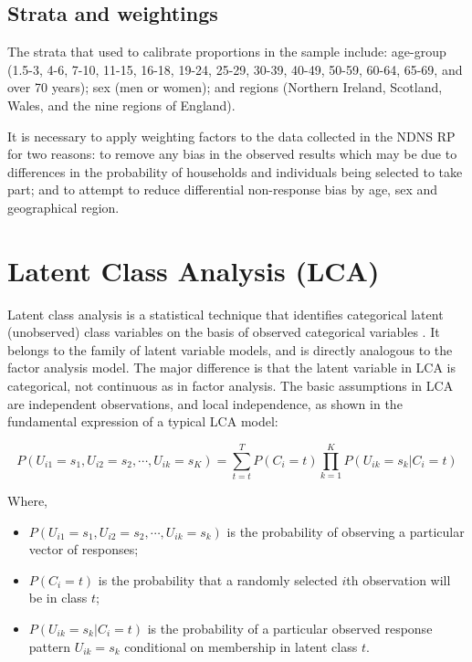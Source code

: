 \subsection{Strata and weightings}\vspace{-0.3cm}

The strata that used to calibrate proportions in the sample include: age-group (1.5-3, 4-6, 7-10, 11-15, 16-18, 19-24, 25-29, 30-39, 40-49, 50-59, 60-64, 65-69, and over 70 years); sex (men or women); and regions (Northern Ireland, Scotland, Wales, and the nine regions of England). 

It is necessary to apply weighting factors to the data collected in the NDNS RP for two reasons: to remove any bias in the observed results which may be due to differences in the probability of households and individuals being selected to take part; and to attempt to reduce differential non-response bias by age, sex and geographical region. 

\section{Latent Class Analysis (LCA)}\vspace{-0.3cm}

Latent class analysis is a statistical technique that identifies categorical latent (unobserved) class variables on the basis of observed categorical variables \parencite{collins2010latent}. It belongs to the family of latent variable models, and is directly analogous to the factor analysis model. The major difference is that the latent variable in LCA is categorical, not continuous as in factor analysis. The basic assumptions in LCA are independent observations, and local independence, as shown in the fundamental expression of a typical LCA model: \vspace{-0.8cm}

\begin{equation}
P(U_{i1} = s_1, U_{i2} = s_2, \cdots, U_{ik} = s_K) = \sum_{t=t}^{T}P(C_i = t)\prod_{k = 1}^{K}P(U_{ik} = s_k | C_i = t)
\label{LCA}
\end{equation}\vspace{-0.7cm}

Where, 

\begin{itemize}
	\item $P(U_{i1} = s_1, U_{i2} = s_2, \cdots, U_{ik} = s_k)$ is the probability of observing a particular vector of responses;
	\item $P(C_i = t)$ is the probability that a randomly selected $i$th observation will be in class $t$;
	\item $P(U_{ik} = s_k | C_i = t)$ is the probability of a particular observed response pattern $U_{ik} = s_k$ conditional on membership in latent class $t$.
\end{itemize}


